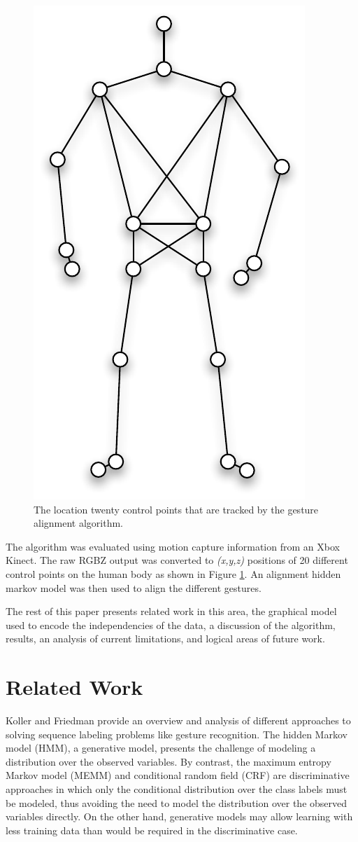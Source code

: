 \documentclass{article}
\begin{document}
\begin{figure}
\begin{centering}
\includegraphics[width=0.4\columnwidth]{figures/control_points.pdf}

\caption{The location twenty control points that are tracked by the gesture
alignment algorithm.\label{figure:control_points}}

\end{centering}
\end{figure}

The algorithm was evaluated using motion capture information from an Xbox
Kinect. The raw RGBZ output was converted to \emph{(x,y,z)} positions of 20
different control points on the human body as shown in Figure
\ref{figure:control_points}. An alignment hidden markov model was then used to
align the different gestures.

The rest of this paper presents related work in this area, the graphical model
used to encode the independencies of the data, a discussion of the algorithm,
results, an analysis of current limitations, and logical areas of future work.


\section{Related Work}

Koller and Friedman \cite{Koller2009} provide an overview and analysis of
different approaches to solving sequence labeling problems like gesture
recognition. The hidden Markov model (HMM), a generative model, presents
the challenge of modeling a distribution over the observed variables. By
contrast, the maximum entropy Markov model (MEMM) and conditional random
field (CRF) are discriminative approaches in which only the conditional
distribution over the class labels must be modeled, thus avoiding the need to
model the distribution over the observed variables directly. On the other hand,
generative models may allow learning with less training data than would be
required in the discriminative case.
\end{document}
